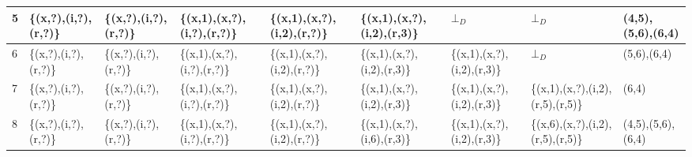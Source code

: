 \documentclass[]{article}
\begin{document}
\begin{sidewaystable}
\begin{tabularx}{\textwidth}{|l|X|X|X|X|X|X|X|X|}
			\hline 
			5 & \{(x,?),(i,?),\newline(r,?)\} & \{(x,?),(i,?),\newline(r,?)\} & \{(x,1),(x,?),\newline(i,?),\newline(r,?)\} & \{(x,1),(x,?),\newline(i,2),\newline(r,?)\} & \{(x,1),(x,?)\newline,\newline(i,2),(r,3)\} & $\bot_D$ & $\bot_D$ & (4,5),(5,6),\newline(6,4)\\ 
			\hline
			6 & \{(x,?),(i,?),\newline(r,?)\} & \{(x,?),(i,?),\newline(r,?)\} & \{(x,1),(x,?),\newline(i,?),(r,?)\} & \{(x,1),(x,?),\newline(i,2),\newline(r,?)\} & \{(x,1),(x,?),\newline(i,2),(r,3)\} & \{(x,1),(x,?),\newline(i,2),\newline(r,3)\} & $\bot_D$ & 
			(5,6),(6,4)\\ 
			\hline
			7 & \{(x,?),(i,?),\newline(r,?)\} & \{(x,?),(i,?),\newline(r,?)\} & \{(x,1),(x,?),\newline(i,?),(r,?)\} & \{(x,1),(x,?),\newline(i,2),\newline(r,?)\} & \{(x,1),(x,?),\newline(i,2),(r,3)\} & \{(x,1),(x,?),\newline(i,2),(r,3)\} & \{(x,1),(x,?),\newline(i,2),(r,5),\newline(r,5)\} & (6,4)\\ 
			\hline
			8 & \{(x,?),(i,?),\newline(r,?)\} & \{(x,?),(i,?),\newline(r,?)\} & \{(x,1),(x,?),\newline(i,?),(r,?)\} & \{(x,1),(x,?),\newline(i,2),\newline(r,?)\} & \{(x,1),(x,?),\newline(i,6),(r,3)\} & \{(x,1),(x,?),\newline(i,2),(r,3)\} & \{(x,6),(x,?),\newline(i,2),(r,5),\newline(r,5)\} & (4,5),(5,6),\newline(6,4)\\ 

\end{tabularx}
\end{sidewaystable}
\end{document}
